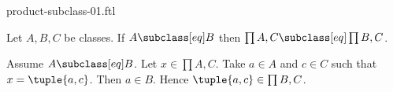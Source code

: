 \documentclass{article}
\begin{document}
\begin{smodule}[creators={Marcel Schütz}]{product-subclass-01.ftl}

  \begin{fproposition*}[label=4524577426243584]
    Let $A, B, C$ be classes.
    If $A \subclass[eq] B$ then $\prod{A,C} \subclass[eq] \prod{B,C}$.
  \end{fproposition*}
  \begin{fproof}
    Assume $A \subclass[eq] B$.
    Let $x \in \prod{A,C}$.
    Take $a \in A$ and $c \in C$ such that $x = \tuple{a,c}$.
    Then $a \in B$.
    Hence $\tuple{a,c} \in \prod{B,C}$.
  \end{fproof}
\end{smodule}
\end{document}
